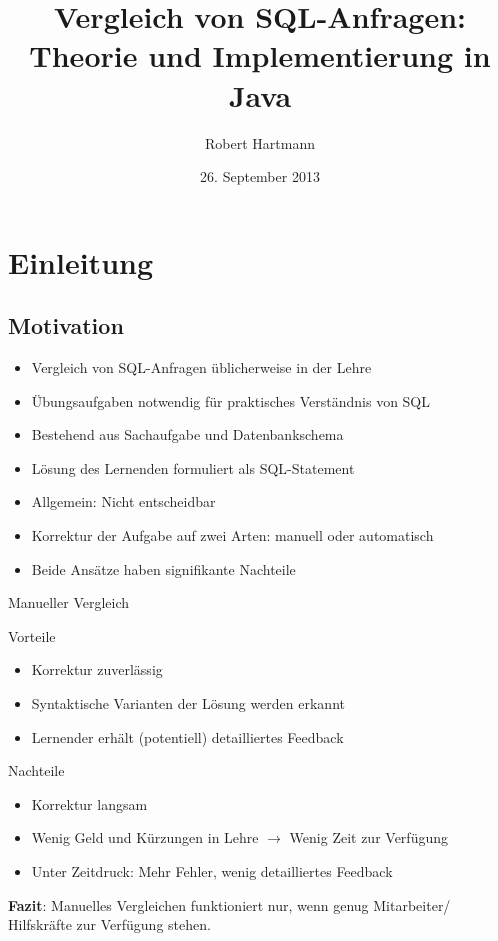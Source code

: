 \documentclass{beamer}
\title[Vergleich von SQL-Anfragen]{Vergleich von SQL-Anfragen:\\Theorie und Implementierung in Java}
\author[Robert Hartmann]{Robert Hartmann}
\institute[] %
{
  Martin-Luther-Universität Halle-Wittenberg\\
  Naturwissenschaftliche Fakultät III\\
  Institut für Informatik
}
\date[]{26. September 2013}
\begin{document}
\begin{frame}
  \titlepage
\end{frame}

\begin{frame}{}
  \tableofcontents
\end{frame}

\section{Einleitung}
\subsection{Motivation}

\begin{frame}
\begin{itemize}
\item Vergleich von SQL-Anfragen üblicherweise in der Lehre
\item Übungsaufgaben notwendig für praktisches Verständnis von SQL
\item Bestehend aus Sachaufgabe und Datenbankschema
\item Lösung des Lernenden formuliert als SQL-Statement
\item Allgemein: Nicht entscheidbar
\item Korrektur der Aufgabe auf zwei Arten: manuell oder automatisch
\item Beide Ansätze haben signifikante Nachteile 
\end{itemize}

\end{frame}

\begin{frame}{Manueller Vergleich}
\begin{block}{Vorteile}
\begin{itemize}
\item Korrektur zuverlässig 
\item Syntaktische Varianten der Lösung werden erkannt
\item Lernender erhält (potentiell) detailliertes Feedback
\end{itemize}
\end{block}

\begin{alertblock}{Nachteile}
\begin{itemize}
\item Korrektur langsam
\item Wenig Geld und Kürzungen in Lehre $\to$ Wenig Zeit zur Verfügung
\item Unter Zeitdruck: Mehr Fehler, wenig detailliertes Feedback
\end{itemize}
\end{alertblock}

\textbf{Fazit}: Manuelles Vergleichen funktioniert nur, wenn genug Mitarbeiter/ Hilfskräfte zur Verfügung stehen.
\end{frame}
\end{document}
